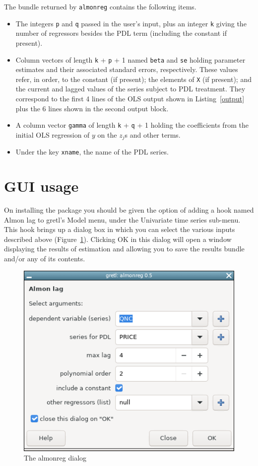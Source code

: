 \documentclass{article}
\begin{document}
The bundle returned by \texttt{almonreg} contains the following items.
\begin{itemize}
\item The integers \texttt{p} and \texttt{q} passed in the user's
  input, plus an integer \texttt{k} giving the number of regressors
  besides the PDL term (including the constant if present).
\item Column vectors of length \texttt{k} + \texttt{p} + 1 named
  \texttt{beta} and \texttt{se} holding parameter estimates and their
  associated standard errors, respectively. These values refer, in
  order, to the constant (if present); the elements of \texttt{X} (if
  present); and the current and lagged values of the series subject to
  PDL treatment. They correspond to the first 4 lines of the OLS
  output shown in Listing~\ref{output} plus the 6 lines shown in the
  second output block.
\item A column vector \texttt{gamma} of length \texttt{k} + \texttt{q}
  + 1 holding the coefficients from the initial OLS regression of $y$
  on the $z_j$s and other terms.
\item Under the key \texttt{xname}, the name of the PDL series.

\end{itemize}

\section{GUI usage}

On installing the package you should be given the option of adding a
hook named \textsf{Almon lag} to gretl's \textsf{Model} menu, under
the \textsf{Univariate time series} sub-menu. This hook brings up a
dialog box in which you can select the various inputs described above
(Figure~\ref{fig:dialog}). Clicking \textsf{OK} in this dialog will
open a window displaying the results of estimation and allowing you to
save the results bundle and/or any of its contents.

\begin{figure}[htbp]
  \centering
  \includegraphics[scale=0.6]{almonreg.png}
  \caption{The almonreg dialog}
  \label{fig:dialog}
\end{figure}
\end{document}
